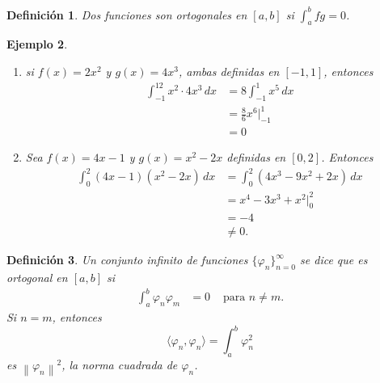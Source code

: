 \documentclass[11pt,letterpaper]{report}
\newtheorem{defn}{Definición}[chapter]
\newtheorem{example}[defn]{Ejemplo}
\newcommand\norm[1]{\left\|#1\right\|}
\newcommand\<{\langle}
\renewcommand\>{\rangle}
\renewcommand\phi\varphi
\begin{document}
\begin{defn}
  Dos funciones son ortogonales en $[a,b]$ si $\int_a^bfg=0$.
\end{defn}
\begin{example}
  \begin{enumerate}
    \item si $f(x)=2x^2$ y $g(x)=4x^3$, ambas definidas en
    $[-1,1]$, entonces
    \begin{align*}
      \int_{-1}^12x^2\cdot 4x^3\,dx
      &= 8\int_{-1}^1x^5\,dx \\
      &= \frac{8}{6}x^6|_{-1}^1 \\
      &= 0
    \end{align*}
    \item Sea $f(x)=4x-1$ y $g(x)=x^2-2x$ definidas en $[0,2]$.
    Entonces
    \begin{align*}
      \int_0^2(4x-1)(x^2-2x)\,dx
      &= \int_0^2(4x^3-9x^2+2x)\,dx \\
      &= x^4-3x^3+x^2 |_0^2 \\
      &= -4 \\
      &\neq 0.
    \end{align*}
  \end{enumerate}
\end{example}

\begin{defn}
  Un conjunto infinito de funciones $\{\phi_n\}_{n=0}^\infty$ se
  dice que es ortogonal en $[a,b]$ si
  \begin{align*}
    \int_a^b\phi_n\phi_m &= 0 & \text{ para } n\neq m.
  \end{align*}
  Si $n=m$, entonces
  \[
    \<\phi_n,\phi_n\> = \int_a^b \phi_n^2
  \]
  es $\norm{\phi_n}^{2}$, la norma cuadrada de $\phi_n$.
\end{defn}
\end{document}
